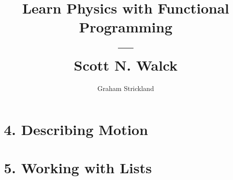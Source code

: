 \documentclass{article}
\title{Learn Physics with Functional Programming\\---\\Scott N. Walck}
\author{Graham Strickland}
\begin{document}
\maketitle  

\section*{4. Describing Motion}


\section*{5. Working with Lists}

\end{document}
